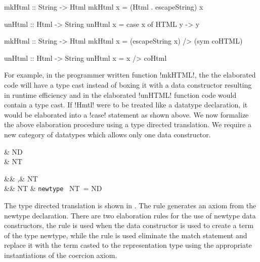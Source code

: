 \documentclass[manuscript,screen,nonacm]{acmart}
\begin{document}
\begin{minipage}[ht]{0.5\linewidth}
\begin{code}
mkHtml :: String -> Html
mkHtml x = (Html . escapeString) x

unHtml :: Html -> String
unHtml x = case x of HTML y -> y
\end{code}
\end{minipage}%
\begin{minipage}[ht]{0.5\linewidth}
\begin{code}
mkHtml :: String -> Html
mkHtml x = (escapeString x) /> (sym coHTML)

unHtml :: Html -> String
unHtml x = x /> coHtml
\end{code}
\end{minipage}

For example, in the programmer written function !mkHTML!, the the elaborated \SFC code will have a type cast instead of boxing it with a data constructor resulting in runtime efficiency and in the elaborated !unHTML! function code would contain a type cast. If !Hmtl! were to be treated like a datatype declaration, it would be elaborated into a !case! statement as shown above. We now formalize the above elaboration procedure using a type directed translation. We require a new category of datatypes which allows only one data constructor.

\begin{syntax}
   & ND\\
   & NT
\end{syntax}
\begin{syntax}
                 && \tau,\sigma \bnfeq& \alpha \bnfor \cdots \bnfor NT\\
   && NT \bnfeq& \texttt{newtype}~ NT~\many\alpha = ND~\\
\end{syntax}

The type directed translation is shown in . The rule  generates an axiom from the newtype declaration. There are two elaboration rules for the use of newtype data constructors, the rule  is used when the data constructor is used to create a term of the type newtype, while the rule  is used eliminate the match statement and replace it with the term casted to the representation type using the appropriate instantiations of the coercion axiom.
\end{document}
